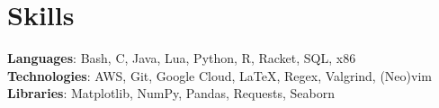 \documentclass[letterpaper,11pt]{article}
\begin{document}
\section{Skills}
\begin{itemize}[leftmargin=0.15in, label={}]
    \small{\item{
        \textbf{Languages}{: Bash, C, Java, Lua, Python, R, Racket, SQL, x86} \\
        \textbf{Technologies}{: AWS, Git, Google Cloud, \LaTeX, Regex, Valgrind, (Neo)vim} \\
        \textbf{Libraries}{: Matplotlib, NumPy, Pandas, Requests, Seaborn} \\
    }}
\end{itemize}
\end{document}
